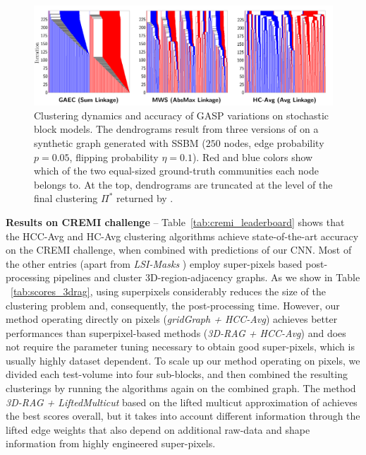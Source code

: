 \begin{figure}[tp]
\centering
\includegraphics[width=\textwidth,trim=0 10 60 0, clip]{./figures/GASP/dendrograms/new_agglo_order.png} %
\caption{Clustering dynamics and accuracy of GASP variations on stochastic block models. The dendrograms result from three versions of \algname{} on a synthetic graph generated with SSBM ($250$ nodes, edge probability $p=0.05$, flipping probability $\eta=0.1$).  Red and blue colors show which of the two equal-sized ground-truth communities each node belongs to. At the top, dendrograms are truncated at the level of the final clustering $\Pi^*$ returned by \algname{}. \label{fig:dendrograms}}
\end{figure}






\textbf{Results on CREMI challenge} -- 
Table~\ref{tab:cremi_leaderboard} shows that the HCC-Avg and HC-Avg clustering algorithms achieve state-of-the-art accuracy on the CREMI challenge, when combined with predictions of our CNN.
Most of the other entries (apart from \emph{LSI-Masks} \cite{bailoni2020proposal}) employ super-pixels based post-processing pipelines and cluster 3D-region-adjacency graphs. As we show in Table ~\ref{tab:scores_3drag}, using superpixels considerably reduces the size of the clustering problem and, consequently, the post-processing time. 
However, our method operating directly on pixels (\emph{gridGraph + HCC-Avg}) achieves better performances than superpixel-based methods (\emph{3D-RAG + HCC-Avg}) and does not require the parameter tuning necessary to obtain good super-pixels, which is usually highly dataset dependent.
To scale up our method operating on pixels, we divided each test-volume into four sub-blocks, and then combined the resulting clusterings by running the algorithms again on the combined graph.
The method \emph{3D-RAG + LiftedMulticut} based on the lifted multicut approximation of \cite{beier2017multicut} achieves the best scores overall, but it takes into account different information through the lifted edge weights that also depend on additional raw-data and shape information from highly engineered super-pixels. 


